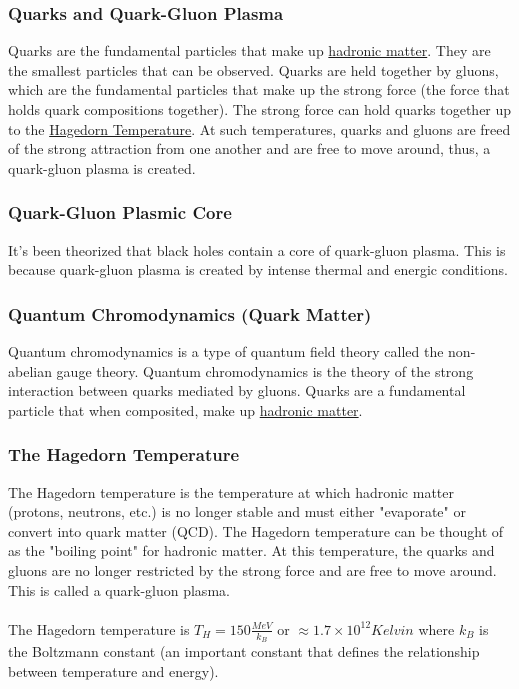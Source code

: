 \documentclass{article}
\begin{document}
\subsubsection{Quarks and Quark-Gluon Plasma}
Quarks are the fundamental particles that make up \hyperref[sec:hadronicmatter]{hadronic matter}. They are the smallest particles that can be observed. Quarks are held together by gluons, which are the fundamental particles that make up the strong force (the force that holds quark compositions together). The strong force can hold quarks together up to the \hyperref[sec:hagedorntemperature]{Hagedorn Temperature}. At such temperatures, quarks and gluons are freed of the strong attraction from one another and are free to move around, thus, a quark-gluon plasma is created.

\subsubsection{Quark-Gluon Plasmic Core}
It's been theorized that black holes contain a core of quark-gluon plasma. This is because quark-gluon plasma is created by intense thermal and energic conditions.

\subsubsection{Quantum Chromodynamics (Quark Matter)}
Quantum chromodynamics is a type of quantum field theory called the non-abelian gauge theory. Quantum chromodynamics is the theory of the strong interaction between quarks mediated by gluons. Quarks are a fundamental particle that when composited, make up \hyperref[sec:hadronicmatter]{hadronic matter}.

\subsubsection{The Hagedorn Temperature}\label{sec:hagedorntemperature}
The Hagedorn temperature is the temperature at which hadronic matter (protons, neutrons, etc.) is no longer stable and must either "evaporate" or convert into quark matter (QCD). The Hagedorn temperature can be thought of as the "boiling point" for hadronic matter. At this temperature, the quarks and gluons are no longer restricted by the strong force and are free to move around. This is called a quark-gluon plasma.\\\\
The Hagedorn temperature is $T_H = 150 \frac{MeV}{k_B}$ or $\approx 1.7\times 10^{12} Kelvin$ where $k_B$ is the Boltzmann constant (an important constant that defines the relationship between temperature and energy).
\end{document}
